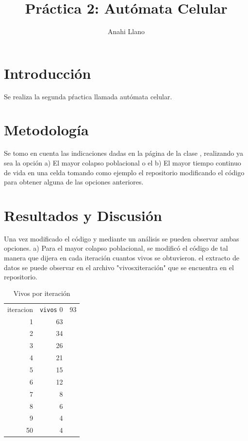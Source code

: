 \documentclass{article}
\title{Pr\'actica 2: Aut\'omata Celular}
\author{Anahi Llano}
\begin{document}
\maketitle

\section{Introducci\'{o}n}\label{into}

Se realiza la segunda p\'ractica \cite{elisa} llamada aut\'omata celular.
 
\section{Metodolog\'{i}a}\label{met}

Se tomo en cuenta las indicaciones dadas en la p\'{a}gina de la clase \cite{elisa}, realizando ya sea la opci\'on a) El mayor colapso poblacional o el b) El mayor tiempo continuo de vida en una celda tomando como ejemplo el repositorio \cite{SatuElisa} modificando el c\'odigo para obtener alguna de las opciones anteriores.

\section{Resultados y Discusi\'{o}n}\label{res}

Una vez modificado el c\'odigo y mediante un an\'alisis se pueden observar ambas opciones.
a) Para el mayor colapso poblacional, se modific\'o el c\'odigo de tal manera que dijera en cada iteraci\'on cuantos vivos se obtuvieron. \cite{ana} el extracto de datos se puede observar en el archivo "vivosxiteraci\'on" que se encuentra en el repositorio.

\begin{table}
  \caption{Vivos por iteraci\'on}
  \label{t1}
  \begin{center}
    \begin{tabular}{rrr}
      iteracion & \texttt{vivos}
      0 &  93        \\
      1 &  63        \\
      2 &  34       \\
      3 &  26    \\
      4 &  21  \\
      5 &  15 \\
      6 &  12 \\ 
      7 &  8   \\
      8 &  6  \\
      9 &  4  \\
      50 &  4  

\end{tabular}
\end{center}
\end{table}
  
\end{document}
